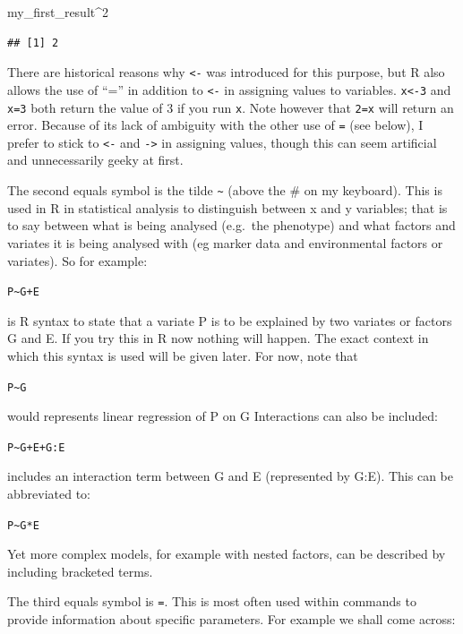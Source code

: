\documentclass[
]{book}
\newenvironment{Shaded}{\begin{snugshade}}{\end{snugshade}}
\newcommand{\DecValTok}[1]{\textcolor[rgb]{0.00,0.00,0.81}{#1}}
\newcommand{\NormalTok}[1]{#1}
\newcommand{\SpecialCharTok}[1]{\textcolor[rgb]{0.00,0.00,0.00}{#1}}
\begin{document}
\begin{Shaded}
\begin{Highlighting}[]
\NormalTok{my\_first\_result}\SpecialCharTok{\^{}}\DecValTok{2}
\end{Highlighting}
\end{Shaded}

\begin{verbatim}
## [1] 2
\end{verbatim}

There are historical reasons why \texttt{\textless{}-} was introduced for this purpose, but R also allows the use of ``='' in addition to \texttt{\textless{}-} in assigning values to variables. \texttt{x\textless{}-3} and \texttt{x=3} both return the value of 3 if you run \texttt{x}. Note however that \texttt{2=x} will return an error. Because of its lack of ambiguity with the other use of \texttt{=} (see below), I prefer to stick to \texttt{\textless{}-} and \texttt{-\textgreater{}} in assigning values, though this can seem artificial and unnecessarily geeky at first.

The second equals symbol is the tilde \texttt{\textasciitilde{}} (above the \# on my keyboard). This is used in R in statistical analysis to distinguish between x and y variables; that is to say between what is being analysed (e.g.~the phenotype) and what factors and variates it is being analysed with (eg marker data and environmental factors or variates). So for example:

\texttt{P\textasciitilde{}G+E}

is R syntax to state that a variate P is to be explained by two variates or factors G and E. If you try this in R now nothing will happen. The exact context in which this syntax is used will be given later. For now, note that

\texttt{P\textasciitilde{}G}

would represents linear regression of P on G Interactions can also be included:

\texttt{P\textasciitilde{}G+E+G:E}

includes an interaction term between G and E (represented by G:E). This can be abbreviated to:

\texttt{P\textasciitilde{}G*E}

Yet more complex models, for example with nested factors, can be described by including bracketed terms.

The third equals symbol is \texttt{=}. This is most often used within commands to provide information about specific parameters. For example we shall come across:
\end{document}
